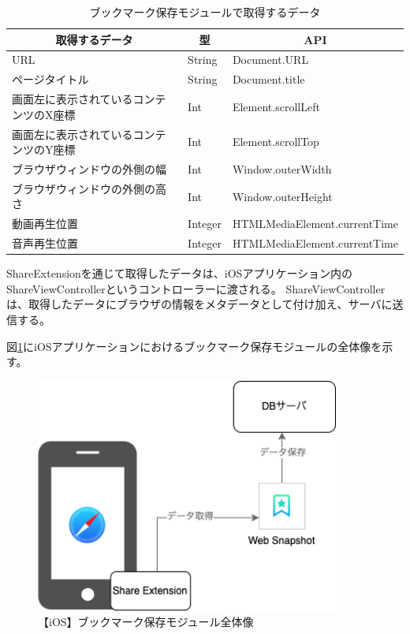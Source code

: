\begin{table}[htbp]
  \label{tb:impl-ios-data-js-api}
  \caption{ブックマーク保存モジュールで取得するデータ}
  \begin{center}
    \begin{tabular}{|l|l|l|}
    \hline
    \multicolumn{1}{|c|}{\textbf{取得するデータ}} & \multicolumn{1}{|c|}{\textbf{型}} & \multicolumn{1}{|c|}{\textbf{API}} \\\hline
    URL & String & Document.URL \\ \hline
    ページタイトル & String & Document.title \\ \hline
    画面左に表示されているコンテンツのX座標 & Int & Element.scrollLeft \\ \hline
    画面左に表示されているコンテンツのY座標 & Int & Element.scrollTop \\ \hline
    ブラウザウィンドウの外側の幅 & Int & Window.outerWidth \\ \hline
    ブラウザウィンドウの外側の高さ & Int & Window.outerHeight \\ \hline
    動画再生位置 & Integer & HTMLMediaElement.currentTime \\ \hline
    音声再生位置 & Integer & HTMLMediaElement.currentTime \\ \hline
    \end{tabular}
  \end{center}
\end{table}

ShareExtensionを通じて取得したデータは、iOSアプリケーション内のShareViewControllerというコントローラーに渡される。
ShareViewControllerは、取得したデータにブラウザの情報をメタデータとして付け加え、サーバに送信する。

図\ref{fig:impl-ios-bookmark-save-module}にiOSアプリケーションにおけるブックマーク保存モジュールの全体像を示す。

\begin{figure}[htbp]
  \label{fig:impl-ios-bookmark-save-module}
  \begin{center}
    \includegraphics[bb=0 0 351 271,width=10cm]{img/050_implementation/ios/impl-ios-bookmark-save-module.pdf}
  \end{center}
  \caption{【iOS】ブックマーク保存モジュール全体像}
\end{figure}

